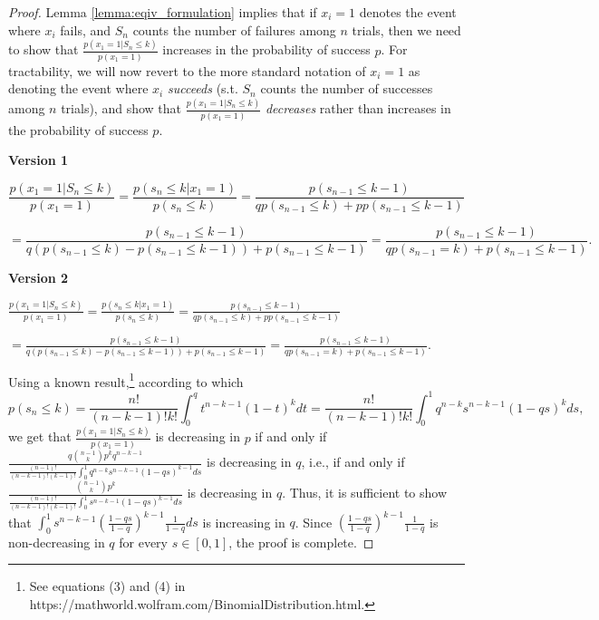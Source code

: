 \documentclass[12pt,a4paper]{article}
\begin{document}
\begin{proof}
Lemma \ref{lemma:eqiv_formulation} implies that if $x_i=1$ denotes the event where $x_i$ fails, and $S_n$ counts the number of failures among $n$ trials, then we need to show that $\frac{p(x_1=1|S_n \leq k)}{p(x_1=1)}$ increases in the probability of success $p$.
For tractability, we will now revert to the more standard notation of $x_i=1$ as denoting the event where $x_i$ \textit{succeeds} (s.t. $S_n$ counts the number of successes among $n$ trials), and show that $\frac{p(x_1=1|S_n \leq k)}{p(x_1=1)}$ \textit{decreases} rather than increases in the probability of success $p$.
\vspace{0.6 cm}

\noindent \textbf{Version 1}

\begin{equation*}
    \frac{p(x_1=1|S_n \leq k)}{p(x_1=1)}=\frac{p(s_n \leq k|x_1=1)}{p(s_n \leq k)}=\frac{p(s_{n-1} \leq k-1)}{qp(s_{n-1} \leq k)+pp(s_{n-1} \leq k-1)}
\end{equation*}


\begin{equation*}
    =\frac{p(s_{n-1} \leq k-1)}{q(p(s_{n-1} \leq k)-p(s_{n-1} \leq k-1))+p(s_{n-1} \leq k-1)}=\frac{p(s_{n-1} \leq k-1)}{qp(s_{n-1}=k)+p(s_{n-1} \leq k-1)}.
\end{equation*}


\vspace{0.3 cm}
\noindent \textbf{Version 2}
\vspace{0.6 cm}

$\frac{p(x_1=1|S_n \leq k)}{p(x_1=1)}=\frac{p(s_n \leq k|x_1=1)}{p(s_n \leq k)}=\frac{p(s_{n-1} \leq k-1)}{qp(s_{n-1} \leq k)+pp(s_{n-1} \leq k-1)}$

\vspace{0.3cm}
$=\frac{p(s_{n-1} \leq k-1)}{q(p(s_{n-1} \leq k)-p(s_{n-1} \leq k-1))+p(s_{n-1} \leq k-1)}=\frac{p(s_{n-1} \leq k-1)}{qp(s_{n-1}=k)+p(s_{n-1} \leq k-1)}.$
\vspace{1 cm}

\noindent 
Using a known result,\footnote{See equations (3) and (4) in https://mathworld.wolfram.com/BinomialDistribution.html.} according to which
\begin{equation*}
    p(s_n \leq k) = \frac{n!}{(n-k-1)!k!}\int_0^q t^{n-k-1}(1-t)^k dt = \frac{n!}{(n-k-1)!k!}\int_0^1 q^{n-k} s^{n-k-1} (1-qs)^k ds,
\end{equation*}
we get that $\frac{p(x_1=1|S_n \leq k)}{p(x_1=1)}$ is decreasing in $p$ if and only if $\frac{q \binom{n-1}{k} p^k q^{n-k-1}}{\frac{(n-1)!}{(n-k-1)!(k-1)!}\int_0^1 q^{n-k}s^{n-k-1}(1-qs)^{k-1} ds}$ is decreasing in $q$, i.e., if and only if $\frac{\binom{n-1}{k} p^k}{\frac{(n-1)!}{(n-k-1)!(k-1)!}\int_0^1 s^{n-k-1}(1-qs)^{k-1} ds}$ is decreasing in $q$.
\vspace{0.3cm}
Thus, it is sufficient to show that $\int_0^1 s^{n-k-1}(\frac{1-qs}{1-q})^{k-1}\frac{1}{1-q} ds$ is increasing in $q$. Since $(\frac{1-qs}{1-q})^{k-1}\frac{1}{1-q}$ is non-decreasing in $q$ for every $s \in [0,1]$, the proof is complete.

\end{proof}
\end{document}
